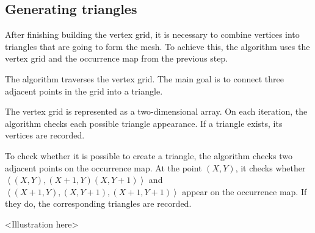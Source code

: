 \subsection{Generating triangles}
\label{subsec:generating_triangles}

After finishing building the vertex grid, it is necessary to combine vertices into triangles that are going to form the mesh. To achieve this, the algorithm uses the vertex grid and the occurrence map from the previous step.

The algorithm traverses the vertex grid. The main goal is to connect three adjacent points in the grid into a triangle.

The vertex grid is represented as a two-dimensional array. On each iteration, the algorithm checks each possible triangle appearance. If a triangle exists, its vertices are recorded.

To check whether it is possible to create a triangle, the algorithm checks two adjacent points on the occurrence map. At the point $(X, Y)$, it checks whether $\left \langle (X, Y), (X+1, Y) (X, Y+1) \right \rangle$ and $\left \langle (X+1, Y), (X, Y+1), (X+1, Y+1) \right \rangle$ appear on the occurrence map. If they do, the corresponding triangles are recorded.

\begin{algorithm}
\end{algorithm}

<Illustration here>
